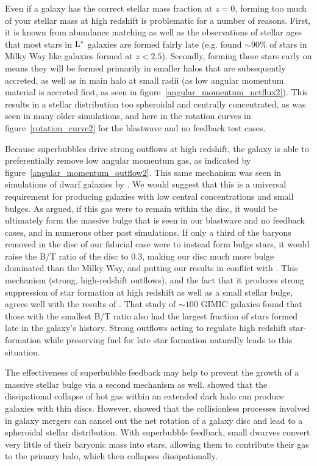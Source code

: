 Even if a galaxy has the correct stellar mass fraction at $z=0$, forming too
much of your stellar mass at high redshift is problematic for a number of
reasons.  First, it is known from abundance matching as well as the observations
of stellar ages that most stars in $\rm{L^*}$ galaxies are formed fairly late
(e.g. \citet{vanDokkum2013} found $\sim90\%$ of stars in Milky Way like galaxies
formed at $z<2.5$).  Secondly, forming these stars early on means they will be
formed primarily in smaller halos that are subsequently accreted, as well as in
main halo at small radii (as low angular momentum material is accreted first, as
seen in figure~\ref{angular_momentum_netflux2}). This results in a stellar
distribution too spheroidal and centrally concentrated, as was seen in many
older simulations, and here in the rotation curves in
figure~\ref{rotation_curve2} for the blastwave and no feedback test cases.

Because superbubbles drive strong outflows at high redshift, the galaxy is able
to preferentially remove low angular momentum gas, as indicated by
figure~\ref{angular_momentum_outflow2}. This same mechanism  was seen in
simulations of dwarf galaxies by \citet{Brook2011,Brook2012}.  We would suggest
that this is a universal requirement for producing galaxies with low central
concentrations and small bulges.  As \citet{Binney2001} argued, if this gas were
to remain within the disc, it would be ultimately form the massive bulge that is
seen in our blastwave and no feedback cases, and in numerous other past
simulations.  If only a third of the baryons removed in the disc of our fiducial
case were to instead form bulge stars, it would raise the B/T ratio of the disc
to 0.3, making our disc much more bulge dominated than the Milky Way, and
putting our results in conflict with \citet{Allen2006}.  This mechanism (strong,
high-redshift outflows), and the fact that it produces strong suppression of
star formation at high redshift as well as a small stellar bulge, agrees well
with the results of \citet{Sales2012}.  That study of $\sim100$ GIMIC
\citep{Crain2009} galaxies found that those with the smallest B/T ratio also had
the largest fraction of stars formed late in the galaxy's history.  Strong
outflows acting to regulate high redshift star-formation while preserving fuel
for late star formation naturally leads to this situation.

The effectiveness of superbubble feedback may help to prevent the growth of a
massive stellar bulge via a second mechanism as well.  \citet{Fall1980} showed
that the dissipational collapse of hot gas within an extended dark halo can
produce galaxies with thin discs.  However, \citet{Cole2000} showed that the
collisionless processes involved in galaxy mergers can cancel out the net
rotation of a galaxy disc and lead to a spheroidal stellar distribution.  With
superbubble feedback, small dwarves convert very little of their baryonic mass
into stars, allowing them to contribute their gas to the primary halo, which
then collapses dissipationally.  

